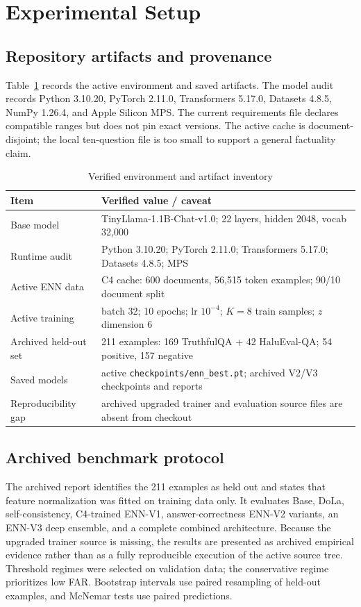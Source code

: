 \documentclass[conference]{IEEEtran}
\newcommand{\code}[1]{\texttt{#1}}
\begin{document}
\section{Experimental Setup}
\subsection{Repository artifacts and provenance}
Table~\ref{tab:env} records the active environment and saved artifacts. The model audit records Python 3.10.20, PyTorch 2.11.0, Transformers 5.17.0, Datasets 4.8.5, NumPy 1.26.4, and Apple Silicon MPS. The current requirements file declares compatible ranges but does not pin exact versions. The active cache is document-disjoint; the local ten-question file is too small to support a general factuality claim.

\begin{table}[t]\caption{Verified environment and artifact inventory}\label{tab:env}\centering\scriptsize\begin{tabular}{@{}p{}p{}@{}}\toprule
Item & Verified value / caveat\\\midrule
Base model & TinyLlama-1.1B-Chat-v1.0; 22 layers, hidden 2048, vocab 32,000\\
Runtime audit & Python 3.10.20; PyTorch 2.11.0; Transformers 5.17.0; Datasets 4.8.5; MPS\\
Active ENN data & C4 cache: 600 documents, 56,515 token examples; 90/10 document split\\
Active training & batch 32; 10 epochs; lr $10^{-4}$; $K=8$ train samples; $z$ dimension 6\\
Archived held-out set & 211 examples: 169 TruthfulQA + 42 HaluEval-QA; 54 positive, 157 negative\\
Saved models & active \code{checkpoints/enn\_best.pt}; archived V2/V3 checkpoints and reports\\
Reproducibility gap & archived upgraded trainer and evaluation source files are absent from checkout\\\bottomrule\end{tabular}\end{table}

\subsection{Archived benchmark protocol}
The archived report identifies the 211 examples as held out and states that feature normalization was fitted on training data only. It evaluates Base, DoLa, self-consistency, C4-trained ENN-V1, answer-correctness ENN-V2 variants, an ENN-V3 deep ensemble, and a complete combined architecture. Because the upgraded trainer source is missing, the results are presented as archived empirical evidence rather than as a fully reproducible execution of the active source tree. Threshold regimes were selected on validation data; the conservative regime prioritizes low FAR. Bootstrap intervals use paired resampling of held-out examples, and McNemar tests use paired predictions.
\end{document}

